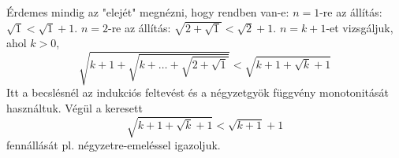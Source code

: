    Érdemes mindig az "elejét" megnézni, hogy rendben van-e:
   $n=1$-re az állítás: $\sqrt{1}<\sqrt{1}+1$.
   $n=2$-re az állítás: $\sqrt{2+\sqrt{1}}<\sqrt{2}+1$.
   $n=k+1$-et vizsgáljuk, ahol $k>0$, 
   \begin{equation*}   
   \sqrt{ k+1 + \sqrt{ k + \hdots  +\sqrt{ 2 + \sqrt{1} } } } < 
   \sqrt{ k+1 + \sqrt{k}+1 }  
   \end{equation*}   
   Itt a becslésnél az indukciós feltevést és a négyzetgyök függvény 
   monotonitását használtuk. Végül a keresett
   \begin{equation*}   
   \sqrt{ k+1 + \sqrt{k}+1 } < \sqrt{k+1}+1
   \end{equation*}
   fennállását pl. négyzetre-emeléssel igazoljuk.
